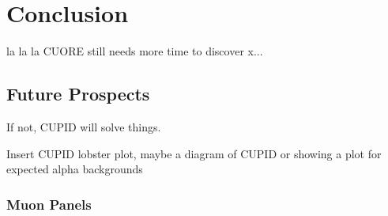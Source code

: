 \chapter{Conclusion}
la la la CUORE still needs more time to discover x...

\section{Future Prospects}
If not, CUPID will solve things.

Insert CUPID lobster plot, maybe a diagram of CUPID or showing a plot for expected alpha backgrounds

\subsection*{Muon Panels}
